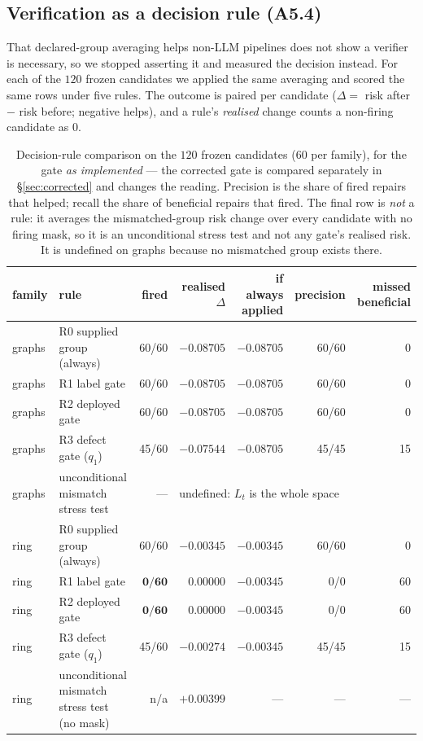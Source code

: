 \documentclass{neurips_2024}
\begin{document}
\subsection{Verification as a decision rule (A5.4)}
\label{sec:decision}

That declared-group averaging helps non-LLM pipelines does not show a verifier is necessary,
so we stopped asserting it and measured the decision instead. For each of the $120$ frozen
candidates we applied the same averaging and scored the same rows under five rules. The
outcome is paired per candidate ($\Delta = $ risk after $-$ risk before; negative helps), and
a rule's \emph{realised} change counts a non-firing candidate as $0$.

\begin{table}[t]
\centering
\caption{Decision-rule comparison on the $120$ frozen candidates ($60$ per family), for the
gate \emph{as implemented} --- the corrected gate is compared separately in
\S\ref{sec:corrected} and changes the reading. Precision is the share of fired repairs that
helped; recall the share of beneficial repairs that fired. The final row is \emph{not} a rule:
it averages the mismatched-group risk change over every candidate with no firing mask, so it
is an unconditional stress test and not any gate's realised risk. It is undefined on graphs
because no mismatched group exists there.}
\label{tab:decision}
\small
\begin{tabular}{llrrrrr}
\toprule
family & rule & fired & realised $\Delta$ & if always applied & precision & missed beneficial \\
\midrule
graphs & R0 supplied group (always) & 60/60 & $-0.08705$ & $-0.08705$ & 60/60 & 0 \\
graphs & R1 label gate & 60/60 & $-0.08705$ & $-0.08705$ & 60/60 & 0 \\
graphs & R2 deployed gate & 60/60 & $-0.08705$ & $-0.08705$ & 60/60 & 0 \\
graphs & R3 defect gate ($q_1$) & 45/60 & $-0.07544$ & $-0.08705$ & 45/45 & 15 \\
graphs & unconditional mismatch stress test & --- & \multicolumn{4}{l}{undefined: $L_t$ is the whole space} \\
\midrule
ring & R0 supplied group (always) & 60/60 & $-0.00345$ & $-0.00345$ & 60/60 & 0 \\
ring & R1 label gate & $\mathbf{0/60}$ & $\mathbf{0.00000}$ & $-0.00345$ & 0/0 & 60 \\
ring & R2 deployed gate & $\mathbf{0/60}$ & $\mathbf{0.00000}$ & $-0.00345$ & 0/0 & 60 \\
ring & R3 defect gate ($q_1$) & 45/60 & $-0.00274$ & $-0.00345$ & 45/45 & 15 \\
ring & unconditional mismatch stress test (no mask) & n/a & $+0.00399$ & --- & --- & --- \\
\bottomrule
\end{tabular}
\end{table}
\end{document}
